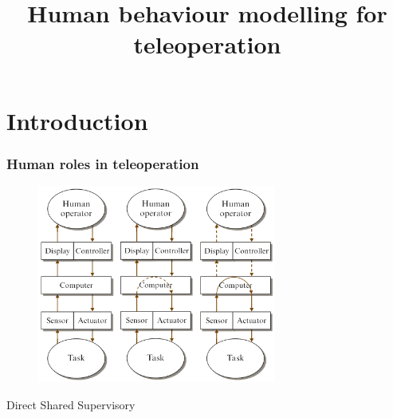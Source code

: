 \documentclass[student]{ITRslides}
\title{Human behaviour modelling for teleoperation}
\begin{document}
\begin{frame}
    \titlepage
\end{frame}


\section{Introduction}

\begin{frame}
	\frametitle{Human roles in teleoperation}


			\begin{figure}
			
			\includegraphics[width=0.7\textwidth]{DirectSharedSup.png}
			\end{figure}
		\vspace{-20pt}
\begin{center}
 Direct \hspace{14mm} Shared \hspace{10mm} Supervisory
\end{center}
 
		
			

\end{frame}
\end{document}
